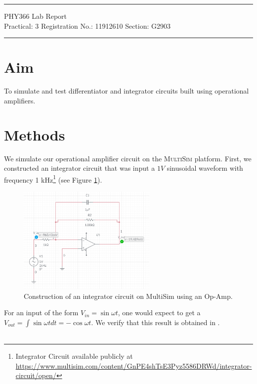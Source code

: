 \documentclass{article}
\begin{document}
	
	\author{Aayush Arya}
	\date{(Submitted: \today)}
	\title{}
	
	\maketitle
	
	\hrule
	\begin{center}
		PHY366 Lab Report\\
		Practical: 3 \quad Registration No.: 11912610 \quad Section: G2903
	\end{center}
	\hrule
	
	\section*{Aim}
	To simulate and test differentiator and integrator circuits built using operational amplifiers.
	
	\section*{Methods}
	
	We simulate our operational amplifier circuit on the \textsc{MultiSim} platform. First, we constructed an integrator circuit that was input a $1V$ sinusoidal waveform with frequency 1 kHz\footnote{Integrator Circuit available publicly at \url{https://www.multisim.com/content/GnPE4shTsE3Pyz5586DRWd/integrator-circuit/open/}}
	(see Figure \ref{fig:circuit}).
	
	\begin{figure}[h!]
		\centering
		\includegraphics[width=0.6\textwidth]{integrator_circuit}
		\caption{Construction of an integrator circuit on MultiSim using an Op-Amp.}
		\label{fig:circuit}
	\end{figure}
	
	For an input of the form $ V_{in} = \sin \omega t$, one would expect to get a $V_{out} = \int\sin \omega t dt = -\cos \omega t$. We verify that this result is obtained in .\\\
	
\end{document}
